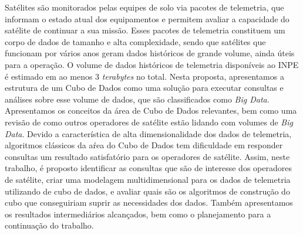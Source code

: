 
\begin{resumo}

\hypertarget{estilo:resumo}{} %

Satélites são monitorados pelas equipes de solo via pacotes de telemetria, que informam o estado atual dos equipamentos e permitem avaliar a capacidade do satélite de continuar a sua missão.
Esses pacotes de telemetria constituem um corpo de dados de tamanho e alta complexidade, sendo que satélites que funcionam por vários anos geram dados históricos de grande volume, ainda úteis para a operação.
{\color{cerulean}
O volume de dados históricos de telemetria disponíveis ao INPE é estimado em ao menos 3 \textit{terabytes} no total.
}
Nesta proposta, apresentamos a estrutura de um Cubo de Dados como uma solução para executar consultas e análises sobre esse volume de dados, que são classificados como \textit{Big Data}.
Apresentamos os conceitos da área de Cubo de Dados relevantes, bem como uma revisão de como outros operadores de satélite estão lidando com volumes de \textit{Big Data}.
Devido a característica de alta dimensionalidade dos dados de telemetria, algoritmos clássicos da aŕea do Cubo de Dados tem dificuldade em responder consultas um resultado satisfatório para os operadores de satélite.
Assim, neste trabalho, é proposto identificar as consultas que são de interesse dos operadores de satélite, criar uma modelagem multidimensional para os dados de telemetria utilizando de cubo de dados, e avaliar quais são os algoritmos de construção do cubo que conseguiriam suprir as necessidades dos dados.
Também apresentamos os resultados intermediários alcançados, bem como o planejamento para a continuação do trabalho.


\end{resumo}
